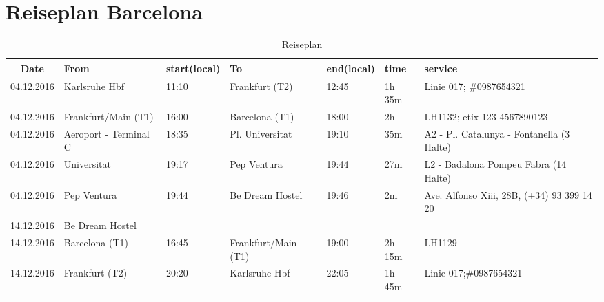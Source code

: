 \documentclass[a4paper]{scrartcl}
\begin{document}
\clearpage
\section*{Reiseplan Barcelona}
\vspace*{\fill}
    \begin{table}[ht]
        \centering
        \begin{tabular}{cp{3cm} p{1cm} p{3cm} p{1cm} l p{5cm}}
        \toprule
    \textbf{Date}  & \textbf{From}        & \textbf{start\newline (local)} & \textbf{To} & \textbf{end\newline (local)}  & \textbf{time} & \textbf{service} \\ \midrule
    04.12.2016 & Karlsruhe Hbf            & 11:10          & Frankfurt (T2)           & 12:45    & 1h 35m & Linie 017; \#0987654321\\
    04.12.2016 & Frankfurt/Main (T1)      & 16:00          & Barcelona (T1)           & 18:00    & 2h     & LH1132; etix 123­-4567890123\\
    04.12.2016 & Aeroport - Terminal C    & 18:35          & Pl. Universitat          & 19:10    &    35m & A2 - Pl. Catalunya - Fontanella (3 Halte) \\
    04.12.2016 & Universitat              & 19:17          & Pep Ventura              & 19:44    &    27m & L2 - Badalona Pompeu Fabra (14 Halte) \\
    04.12.2016 & Pep Ventura              & 19:44          & Be Dream Hostel          & 19:46    &     2m & Ave. Alfonso Xiii, 28B, (+34) 93 399 14 20 \\\midrule
    14.12.2016 &   Be Dream Hostel        &                &                          &          &        &  \\
    14.12.2016 & Barcelona (T1)           & 16:45          & Frankfurt/Main (T1)      & 19:00    & 2h 15m & LH1129\\
    14.12.2016 & Frankfurt (T2)           & 20:20          & Karlsruhe Hbf            & 22:05    & 1h 45m & Linie 017;\#0987654321\\
        \bottomrule
        \end{tabular}
        \caption{Reiseplan}
        \label{table:reiseplan}
    \end{table}
\vfill %
\end{document}
